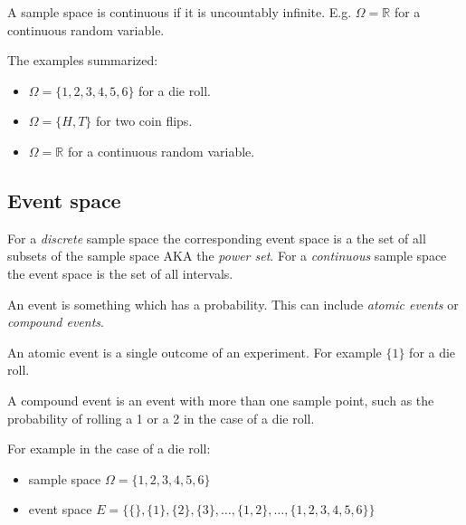 \documentclass[12pt]{article}
\begin{document}
\begin{definition}
    A sample space is continuous if it is uncountably infinite. E.g. $\Omega = \mathbb{R}$ for a continuous random variable.
\end{definition}

The examples summarized:
\begin{itemize}[leftmargin=*, noitemsep]
    \item $\Omega = \{1, 2, 3, 4, 5, 6\}$ for a die roll.
    \item $\Omega = \{H, T\}$ for two coin flips.
    \item $\Omega = \mathbb{R}$ for a continuous random variable.
\end{itemize}

\subsection{Event space}

\begin{definition}
    For a \textit{discrete} sample space the corresponding event space is a the set of all subsets of the sample space AKA the \textit{power set}. For a \textit{continuous} sample space the event space is the set of all intervals.
\end{definition}

\begin{definition}[Event]
    An event is something which has a probability. This can include \textit{atomic events} or \textit{compound events}.    
\end{definition}

\begin{definition}
    An atomic event is a single outcome of an experiment. For example $\{1\}$ for a die roll.
\end{definition}

\begin{definition}
    A compound event is an event with more than one sample point, such as the probability of rolling a 1 or a 2 in the case of a die roll.
\end{definition}

For example in the case of a die roll: 
\begin{itemize}[leftmargin=*, noitemsep]
    \item sample space $\Omega = \{1, 2, 3, 4, 5, 6\}$
    \item event space $E = \{\{\}, \{1\}, \{2\}, \{3\}, \ldots, \{1, 2\}, \ldots, \{1, 2, 3, 4, 5, 6\}\}$
\end{itemize}
\end{document}
